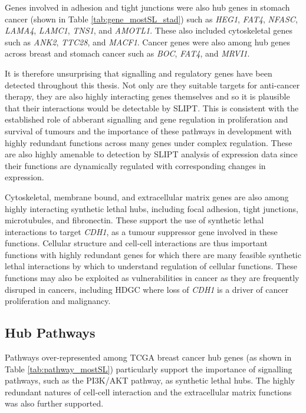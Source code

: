 Genes involved in adhesion and tight junctions were also hub genes in stomach cancer (shown in Table \ref{tab:gene_mostSL_stad}) such as \textit{HEG1}, \textit{FAT4}, \textit{NFASC}, \textit{LAMA4}, \textit{LAMC1}, \textit{TNS1}, and \textit{AMOTL1}. These also included cytoskeletal genes such as \textit{ANK2}, \textit{TTC28}, and \textit{MACF1}. Cancer genes were also among hub genes across breast and stomach cancer such as \textit{BOC}, \textit{FAT4}, and \textit{MRVI1}. 

It is therefore unsurprising that signalling and regulatory genes have been detected throughout this thesis. Not only are they suitable targets for anti-cancer therapy, they are also highly interacting genes themselves and so it is plausible that their interactions would be detectable by SLIPT. This is consistent with the established role of abberant signalling and gene regulation in proliferation and survival of tumours and the importance of these pathways in development with highly redundant functions across many genes under complex regulation. These are also highly amenable to detection by SLIPT analysis of expression data since their functions are dynamically regulated with corresponding changes in expression.

Cytoskeletal, membrane bound, and extracellular matrix genes are also among highly interacting synthetic lethal hubs, including focal adhesion, tight junctions, microtubules, and fibronectin. These support the use of synthetic lethal interactions to target \textit{CDH1}, as a tumour suppressor gene involved in these functions. Cellular structure and cell-cell interactions are thus important functions with highly redundant genes for which there are many feasible synthetic lethal interactions by which to understand regulation of cellular functions. These functions may also be exploited as vulnerabilities in cancer as they are frequently disruped in cancers, including HDGC where loss of \textit{CDH1} is a driver of cancer proliferation and malignancy.  


\FloatBarrier

\subsection{Hub Pathways}

Pathways over-represented among TCGA breast cancer hub genes (as shown in Table \ref{tab:pathway_mostSL}) particularly support the importance of signalling pathways, such as the PI3K/AKT pathway, as synthetic lethal hubs. The highly redundant natures of cell-cell interaction and the extracellular matrix functions was also further supported.



